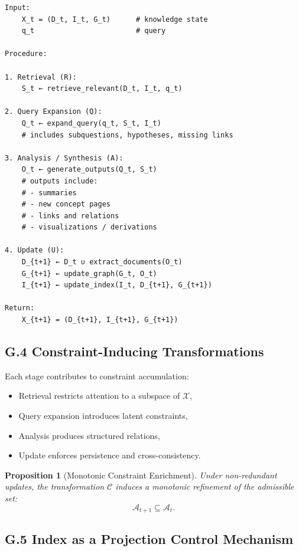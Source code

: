 \documentclass[12pt, oneside]{article}
\theoremstyle{plain}
\newtheorem{proposition}[theorem]{Proposition}
\theoremstyle{definition}
\theoremstyle{remark}
\begin{document}
\begin{tcolorbox}[colback=lightgray, colframe=black, title=Recursive Knowledge Update Operator $\mathcal{C}$]
\begin{verbatim}
Input:
    X_t = (D_t, I_t, G_t)      # knowledge state
    q_t                        # query

Procedure:

1. Retrieval (R):
    S_t ← retrieve_relevant(D_t, I_t, q_t)

2. Query Expansion (Q):
    Q_t ← expand_query(q_t, S_t, I_t)
    # includes subquestions, hypotheses, missing links

3. Analysis / Synthesis (A):
    O_t ← generate_outputs(Q_t, S_t)
    # outputs include:
    # - summaries
    # - new concept pages
    # - links and relations
    # - visualizations / derivations

4. Update (U):
    D_{t+1} ← D_t ∪ extract_documents(O_t)
    G_{t+1} ← update_graph(G_t, O_t)
    I_{t+1} ← update_index(I_t, D_{t+1}, G_{t+1})

Return:
    X_{t+1} = (D_{t+1}, I_{t+1}, G_{t+1})
\end{verbatim}
\end{tcolorbox}

\subsection{G.4 Constraint-Inducing Transformations}

Each stage contributes to constraint accumulation:

\begin{itemize}
\item Retrieval restricts attention to a subspace of $\mathcal{X}$,
\item Query expansion introduces latent constraints,
\item Analysis produces structured relations,
\item Update enforces persistence and cross-consistency.
\end{itemize}

\begin{proposition}[Monotonic Constraint Enrichment]
Under non-redundant updates, the transformation $\mathcal{C}$ induces a monotonic refinement of the admissible set:
\[
\mathcal{A}_{t+1} \subseteq \mathcal{A}_t.
\]
\end{proposition}

\subsection{G.5 Index as a Projection Control Mechanism}
\end{document}
